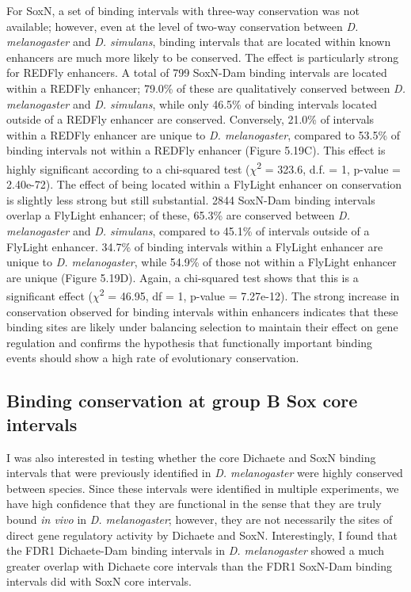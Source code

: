 For SoxN, a set of binding intervals with three-way conservation was not available; however, even at the level of two-way conservation between \emph{D. melanogaster} and \emph{D. simulans}, binding intervals that are located within known enhancers are much more likely to be conserved. The effect is particularly strong for REDFly enhancers. A total of 799 SoxN-Dam binding intervals are located within a REDFly enhancer; 79.0\% of these are qualitatively conserved between \emph{D. melanogaster} and \emph{D. simulans}, while only 46.5\% of binding intervals located outside of a REDFly enhancer are conserved. Conversely, 21.0\% of intervals within a REDFly enhancer are unique to \emph{D. melanogaster}, compared to 53.5\% of binding intervals not within a REDFly enhancer (Figure 5.19C). This effect is highly significant according to a chi-squared test (\(\chi\)\textsuperscript{2} = 323.6, d.f. = 1, p-value = 2.40e-72). The effect of being located within a FlyLight enhancer on conservation is slightly less strong but still substantial. 2844 SoxN-Dam binding intervals overlap a FlyLight enhancer; of these, 65.3\% are conserved between \emph{D. melanogaster} and \emph{D. simulans}, compared to 45.1\% of intervals outside of a FlyLight enhancer. 34.7\% of binding intervals within a FlyLight enhancer are unique to \emph{D. melanogaster}, while 54.9\% of those not within a FlyLight enhancer are unique (Figure 5.19D). Again, a chi-squared test shows that this is a significant effect (\(\chi\)\textsuperscript{2} = 46.95, df = 1, p-value = 7.27e-12). The strong increase in conservation observed for binding intervals within enhancers indicates that these binding sites are likely under balancing selection to maintain their effect on gene regulation and confirms the hypothesis that functionally important binding events should show a high rate of evolutionary conservation.

\subsection{Binding conservation at group B Sox core intervals}
I was also interested in testing whether the core Dichaete and SoxN binding intervals that were previously identified in \emph{D. melanogaster} were highly conserved between species. Since these intervals were identified in multiple experiments, we have high confidence that they are functional in the sense that they are truly bound \emph{in vivo} in \emph{D. melanogaster}; however, they are not necessarily the sites of direct gene regulatory activity by Dichaete and SoxN. Interestingly, I found that the FDR1 Dichaete-Dam binding intervals in \emph{D. melanogaster} showed a much greater overlap with Dichaete core intervals than the FDR1 SoxN-Dam binding intervals did with SoxN core intervals.\\

